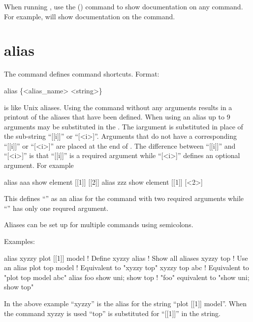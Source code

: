 When running \tao, use the  () command to show documentation on any command.
For example,  will show documentation on the  command.


\vfil
\break

\section{alias}
\label{s:alias}

The  command defines command shortcuts. Format:
\begin{example}
  alias \{<alias_name> <string>\}
\end{example}

\vskip 7pt

 is like Unix aliases. Using the  command without any arguments results in a
printout of the aliases that have been defined. When using an alias up to 9 arguments may be
substituted in the . The i\Th argument is substituted in place of the sub-string
``[[i]]'' or ``[<i>]''.  Arguments that do not have a corresponding ``[[i]]'' or ``[<i>]'' are
placed at the end of . The difference between ``[[i]]'' and ``[<i>]'' is that ``[[i]]''
is a required argument while ``[<i>]'' defines an optional argument. For example
\begin{example}
  alias aaa show element [[1]] [[2]]
  alias zzz show element [[1]] [<2>]
\end{example}
This defines ``'' as an alias for the  command with two required arguments
while ``'' has only one requred argument.

Aliases can be set up for multiple commands using semicolons.

Examples:
\begin{example}
  alias xyzzy plot [[1]] model  ! Define xyzzy
  alias                         ! Show all aliases
  xyzzy top                     ! Use an alias
  plot top model                ! Equivalent to "xyzzy top"
  xyzzy top abc                 ! Equivalent to "plot top model abc"
  alias foo  show uni; show top ! "foo" equivalent to "show uni; show top"
\end{example}
In the above example ``xyzzy'' is the alias for the string ``plot [[1]] model''.  When the
command xyzzy is used ``top'' is substituted for ``[[1]]'' in the string.

